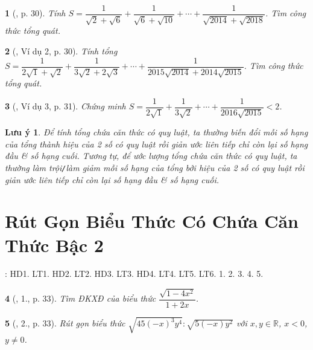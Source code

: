 \documentclass{article}
\newtheorem{baitoan}{}%
\newtheorem{luuy}{Lưu ý}
\begin{document}
\begin{baitoan}[\cite{Binh_boi_duong_Toan_9_tap_1}, p. 30]
	Tính $S = \dfrac{1}{\sqrt{2} + \sqrt{6}} + \dfrac{1}{\sqrt{6} + \sqrt{10}} + \cdots + \dfrac{1}{\sqrt{2014} + \sqrt{2018}}$. Tìm công thức tổng quát.
\end{baitoan}

\begin{baitoan}[\cite{Binh_boi_duong_Toan_9_tap_1}, Ví dụ 2, p. 30]
	Tính tổng $S = \dfrac{1}{2\sqrt{1} + \sqrt{2}} + \dfrac{1}{3\sqrt{2} + 2\sqrt{3}} + \cdots + \dfrac{1}{2015\sqrt{2014} + 2014\sqrt{2015}}$. Tìm công thức tổng quát.
\end{baitoan}

\begin{baitoan}[\cite{Binh_boi_duong_Toan_9_tap_1}, Ví dụ 3, p. 31]
	Chứng minh $S = \dfrac{1}{2\sqrt{1}} + \dfrac{1}{3\sqrt{2}} + \cdots + \dfrac{1}{2016\sqrt{2015}} < 2$.
\end{baitoan}

\begin{luuy}
	Để tính tổng chứa căn thức có quy luật, ta thường biến đổi mỗi số hạng của tổng thành hiệu của 2 số có quy luật rồi giản ước liên tiếp chỉ còn lại số hạng đầu \& số hạng cuối. Tương tự, để ước lượng tổng chứa căn thức có quy luật, ta thường làm trội{\tt/}làm giảm mỗi số hạng của tổng bởi hiệu của 2 số có quy luật rồi giản ước liên tiếp chỉ còn lại số hạng đầu \& số hạng cuối.
\end{luuy}


\section{Rút Gọn Biểu Thức Có Chứa Căn Thức Bậc 2}
\cite[Chap. III, \S4, pp. 67--66]{SGK_Toan_9_Canh_Dieu_tap_1}: HD1. LT1. HD2. LT2. HD3. LT3. HD4. LT4. LT5. LT6. 1. 2. 3. 4. 5.

\begin{baitoan}[\cite{Binh_boi_duong_Toan_9_tap_1}, 1., p. 33]
	Tìm {\rm ĐKXĐ} của biểu thức $\dfrac{\sqrt{1 - 4x^2}}{1 + 2x}$.
\end{baitoan}

\begin{baitoan}[\cite{Binh_boi_duong_Toan_9_tap_1}, 2., p. 33]
	Rút gọn biểu thức $\sqrt{45(-x)^3y^4}:\sqrt{5(-x)y^2}$ với $x,y\in\mathbb{R}$, $x < 0$, $y\ne0$.
\end{baitoan}
\end{document}
